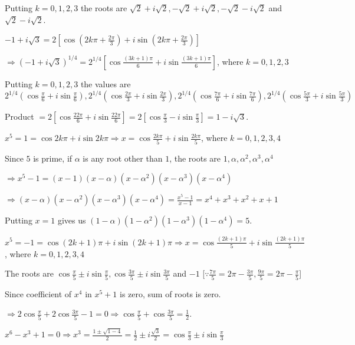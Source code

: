   Putting $k = 0, 1, 2, 3$ the roots are $\sqrt{2} + i\sqrt{2}, -\sqrt{2} + i\sqrt{2}, -\sqrt{2} -
  i\sqrt{2}$ and $\sqrt{2} - i\sqrt{2}$.
\item $-1 + i\sqrt{3} = 2\left[\cos\left(2k\pi + \frac{2\pi}{3}\right) + i\sin\left(2k\pi +
  \frac{2\pi}{3}\right)\right]$

  $\Rightarrow (-1 + i\sqrt{3})^{1/4} = 2^{1/4}\left[\cos\frac{(3k + 1)\pi}{6} + i\sin\frac{(3k +
    1)\pi}{6}\right]$, where $k = 0, 1, 2, 3$

  Putting $k = 0, 1, 2, 3$ the values are $2^{1/4}\left(\cos\frac{\pi}{6} + i\sin\frac{\pi}{6}\right),
  2^{1/4}\left(\cos\frac{2\pi}{3} + i\sin\frac{2\pi}{3}\right), 2^{1/4}\left(\cos\frac{7\pi}{6} +
  i\sin\frac{7\pi}{6}\right), 2^{1/4}\left(\cos\frac{5\pi}{3} + i\sin\frac{5\pi}{3}\right)$

  Product $= 2\left[\cos\frac{22\pi}{6} + i\sin\frac{22\pi}{6}\right] = 2\left[\cos\frac{\pi}{3} -
  i\sin\frac{\pi}{3}\right] = 1 - i\sqrt{3}$.
\item $x^5 = 1 = \cos2k\pi + i\sin2k\pi \Rightarrow x = \cos\frac{2k\pi}{5} + i\sin\frac{2k\pi}{5}$, where
  $k = 0, 1, 2, 3, 4$

  Since $5$ is prime, if $\alpha$ is any root other than $1$, the roots are $1, \alpha, \alpha^2, \alpha^3,
  \alpha^4$

  $\Rightarrow x^5 - 1 = (x - 1)(x - \alpha)(x - \alpha^2)(x - \alpha^3)(x - \alpha^4)$

  $\Rightarrow (x - \alpha)(x - \alpha^2)(x - \alpha^3)(x - \alpha^4) = \frac{x^5 - 1}{x - 1} = x^4 + x^3 +
  x^2 + x + 1$

  Putting $x = 1$ gives us $(1 - \alpha)(1 - \alpha^2)(1 - \alpha^3)(1 - \alpha^4) = 5$.
\item $x^5 = -1 = \cos(2k + 1)\pi + i\sin(2k + 1)\pi \Rightarrow x = \cos\frac{(2k + 1)\pi}{5} +
  i\sin\frac{(2k + 1)\pi}{5}$, where $k = 0, 1, 2, 3, 4$

  The roots are $\cos\frac{\pi}{5}\pm i\sin\frac{\pi}{5}, \cos\frac{3\pi}{5}\pm i\sin\frac{3\pi}{5}$ and
  $-1$ [$\because \frac{7\pi}{5} = 2\pi - \frac{3\pi}{5}, \frac{9\pi}{5} = 2\pi - \frac{\pi}{5}$]

  Since coefficient of $x^4$ in $x^5 + 1$ is zero, sum of roots is zero.

  $\Rightarrow 2\cos\frac{\pi}{5} + 2\cos\frac{3\pi}{5} - 1 = 0 \Rightarrow \cos\frac{\pi}{5} +
  \cos\frac{3\pi}{5} = \frac{1}{2}$.
\item $x^6 - x^3 + 1 = 0 \Rightarrow x^3 = \frac{1\pm\sqrt{1 - 4}}{2} = \frac{1}{2}\pm i\frac{\sqrt{3}}{2} =
  \cos\frac{\pi}{3}\pm i\sin\frac{\pi}{3}$

